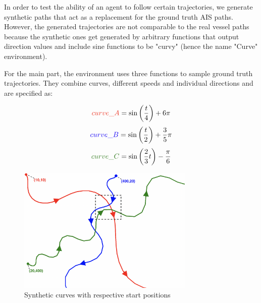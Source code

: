 In order to test the ability of an agent to follow certain trajectories, we generate synthetic paths that act as a replacement for the ground truth AIS paths. However, the generated trajectories are not comparable to the real vessel paths because the synthetic ones get generated by arbitrary functions that output direction values and include sine functions to be "curvy" (hence the name "Curve" environment).
\par
For the main part, the environment uses three functions to sample ground truth trajectories. They combine curves, different speeds and individual directions and are specified as:

\begin{equation}\label{eq:curve_A}
\textcolor[RGB]{235,52,35}{curve\_A} = \sin \left( \frac{t}{4} \right) + 6\pi
\end{equation}
\begin{equation}
\textcolor[RGB]{20,1,244}{curve\_B} = \sin \left( \frac{t}{2} \right)+ \frac{3}{5}\pi
\end{equation}
\begin{equation}
\textcolor[RGB]{54,125,34}{curve\_C} = \sin \left( \frac{2}{3} t \right) - \frac{\pi}{6}
\end{equation}

\begin{figure}[H]
    \centering
    \includegraphics[width=0.75\textwidth]{images/curves.png}
    \caption{Synthetic curves with respective start positions}
    \label{fig:syntheticCurves}
\end{figure}

